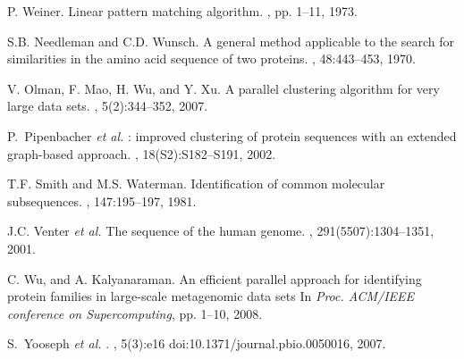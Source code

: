 \documentclass[10pt,journal,letterpaper,compsoc]{IEEEtran}
\begin{document}
\begin{thebibliography}{1}
P. Weiner.
\newblock Linear pattern matching algorithm.
, pp. 1--11, 1973.

S.B. Needleman and C.D. Wunsch.
\newblock A general method applicable to the search for similarities in the
  amino acid sequence of two proteins.
, 48:443--453, 1970.

V. Olman, F. Mao, H. Wu, and Y. Xu.
\newblock A parallel clustering algorithm for very large data sets.
, 5(2):344--352, 2007.


P.~Pipenbacher {\it et al.}
: improved clustering of protein sequences with an extended graph-based approach.
, 18(S2):S182--S191, 2002.


T.F. Smith and M.S. Waterman.
\newblock Identification of common molecular subsequences.
, 147:195--197, 1981.


J.C. Venter {\it et al.}
\newblock The sequence of the human genome.
, 291(5507):1304--1351, 2001.


C. Wu, and A. Kalyanaraman.
\newblock An efficient parallel approach for identifying protein families in large-scale metagenomic data sets
\newblock In {\em Proc. ACM/IEEE conference on Supercomputing}, pp. 1--10, 2008.


S.~Yooseph {\it et al.}
.
, 5(3):e16 doi:10.1371/journal.pbio.0050016,
  2007.




\end{thebibliography}




\end{document}
